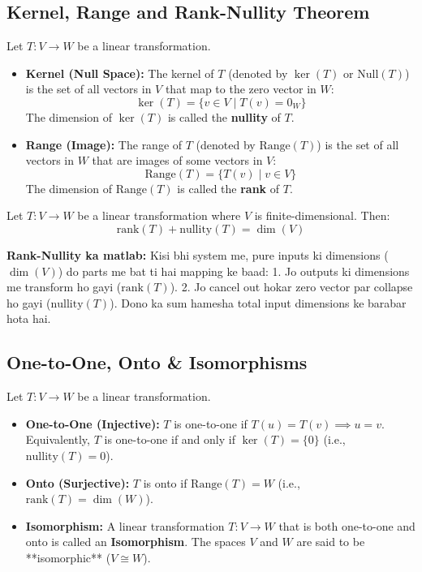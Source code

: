\documentclass[11pt,a4paper]{article}
\begin{document}
\subsection{Kernel, Range and Rank-Nullity Theorem}

\begin{definitionbox}
Let $T: V \to W$ be a linear transformation.
\begin{itemize}
    \item \textbf{Kernel (Null Space):} The kernel of $T$ (denoted by $\ker(T)$ or $\text{Null}(T)$) is the set of all vectors in $V$ that map to the zero vector in $W$:
    \[ \ker(T) = \{ v \in V \mid T(v) = 0_W \} \]
    The dimension of $\ker(T)$ is called the \textbf{nullity} of $T$.
    \item \textbf{Range (Image):} The range of $T$ (denoted by $\text{Range}(T)$) is the set of all vectors in $W$ that are images of some vectors in $V$:
    \[ \text{Range}(T) = \{ T(v) \mid v \in V \} \]
    The dimension of $\text{Range}(T)$ is called the \textbf{rank} of $T$.
\end{itemize}
\end{definitionbox}

\begin{theorembox}
Let $T: V \to W$ be a linear transformation where $V$ is finite-dimensional. Then:
\[ \text{rank}(T) + \text{nullity}(T) = \dim(V) \]
\nobreak
\end{theorembox}

\begin{hinglishbox}
\textbf{Rank-Nullity ka matlab:}
Kisi bhi system me, pure inputs ki dimensions ($\dim(V)$) do parts me bat ti hai mapping ke baad:
1. Jo outputs ki dimensions me transform ho gayi ($\text{rank}(T)$).
2. Jo cancel out hokar zero vector par collapse ho gayi ($\text{nullity}(T)$).
Dono ka sum hamesha total input dimensions ke barabar hota hai.
\end{hinglishbox}

\subsection{One-to-One, Onto \& Isomorphisms}

\begin{definitionbox}
Let $T: V \to W$ be a linear transformation.
\begin{itemize}
    \item \textbf{One-to-One (Injective):} $T$ is one-to-one if $T(u) = T(v) \implies u = v$. Equivalently, $T$ is one-to-one if and only if $\ker(T) = \{ 0 \}$ (i.e., $\text{nullity}(T) = 0$).
    \item \textbf{Onto (Surjective):} $T$ is onto if $\text{Range}(T) = W$ (i.e., $\text{rank}(T) = \dim(W)$).
    \item \textbf{Isomorphism:} A linear transformation $T: V \to W$ that is both one-to-one and onto is called an \textbf{Isomorphism}. The spaces $V$ and $W$ are said to be **isomorphic** ($V \cong W$).
\end{itemize}
\end{definitionbox}
\end{document}
